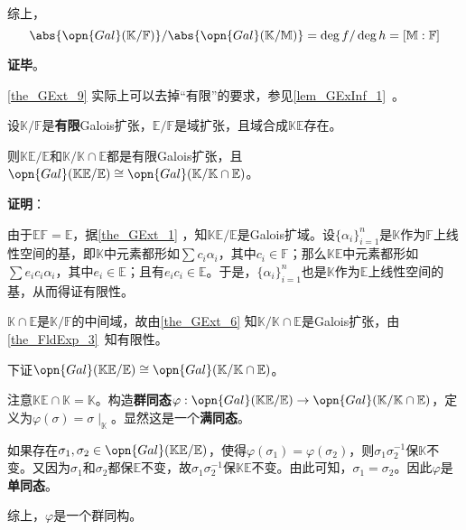 综上，
\begin{equation}
\abs{\opn{Gal}(\mathbb{K}/\mathbb{F})}/\abs{\opn{Gal}(\mathbb{K}/\mathbb{M})}=\deg f/\deg h=[\mathbb{M}:\mathbb{F}]
\end{equation}

\textbf{证毕}。


\autoref{the_GExt_9} 实际上可以去掉“有限”的要求，参见\autoref{lem_GExInf_1}~。






\begin{theorem}{}\label{the_GExt_7}
设$\mathbb{K}/\mathbb{F}$是\textbf{有限}Galois扩张，$\mathbb{E}/\mathbb{F}$是域扩张，且域合成$\mathbb{KE}$存在。

则$\mathbb{KE}/\mathbb{E}$和$\mathbb{K}/\mathbb{K}\cap\mathbb{E}$都是有限Galois扩张，且$\opn{Gal}(\mathbb{KE}/\mathbb{E})\cong\opn{Gal}(\mathbb{K}/\mathbb{K}\cap\mathbb{E})$。
\end{theorem}

\textbf{证明}：

由于$\mathbb{E}\mathbb{F}=\mathbb{E}$，据\autoref{the_GExt_1} ，知$\mathbb{KE}/\mathbb{E}$是Galois扩域。设$\{\alpha_i\}_{i=1}^n$是$\mathbb{K}$作为$\mathbb{F}$上线性空间的基，即$\mathbb{K}$中元素都形如$\sum c_i\alpha_i$，其中$c_i\in\mathbb{F}$；那么$\mathbb{KE}$中元素都形如$\sum e_ic_i\alpha_i$，其中$e_i\in\mathbb{E}$；且有$e_ic_i\in\mathbb{E}$。于是，$\{\alpha_i\}_{i=1}^n$也是$\mathbb{K}$作为$\mathbb{E}$上线性空间的基，从而得证有限性。

$\mathbb{K}\cap\mathbb{E}$是$\mathbb{K}/\mathbb{F}$的中间域，故由\autoref{the_GExt_6} 知$\mathbb{K}/\mathbb{K}\cap\mathbb{E}$是Galois扩张，由\autoref{the_FldExp_3}~知有限性。

下证$\opn{Gal}(\mathbb{KE}/\mathbb{E})\cong\opn{Gal}(\mathbb{K}/\mathbb{K}\cap\mathbb{E})$。

注意$\mathbb{KE}\cap \mathbb{K}=\mathbb{K}$。构造\textbf{群同态}$\varphi:\opn{Gal}(\mathbb{KE}/\mathbb{E})\to\opn{Gal}(\mathbb{K}/\mathbb{K}\cap\mathbb{E})$，定义为$\varphi (\sigma) = \sigma\mid_{\mathbb{K}}$。显然这是一个\textbf{满同态}。

如果存在$\sigma_1, \sigma_2\in\opn{Gal}(\mathbb{KE}/\mathbb{E})$，使得$\varphi(\sigma_1)=\varphi(\sigma_2)$，则$\sigma_1\sigma_2^{-1}$保$\mathbb{K}$不变。又因为$\sigma_1$和$\sigma_2$都保$\mathbb{E}$不变，故$\sigma_1\sigma_2^{-1}$保$\mathbb{KE}$不变。由此可知，$\sigma_1=\sigma_2$。因此$\varphi$是\textbf{单同态}。

综上，$\varphi$是一个群同构。

